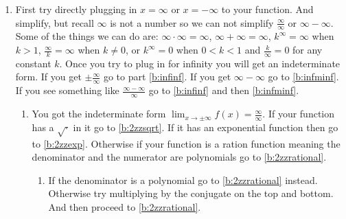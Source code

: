 \documentclass[12pt]{article}
\begin{document}
\begin{enumerate}
    \item \label{b:infstep1} First try directly plugging in $x=\infty$ or $x=-\infty$ to your function. 
    And simplify, but recall $\infty$ is not a number so we can not simplify 
    $\frac{\infty}{\infty}$ or $\infty-\infty$. Some of the things we can do are: 
    $\infty\cdot\infty=\infty$, $\infty+\infty=\infty$, $k^\infty=\infty$ when $k>1$, 
    $\frac{\infty}{k}=\infty$ when $k\neq 0$, or $k^\infty=0$ when $0<k<1$ and $\frac{k}{\infty}=0$ 
    for any constant $k$. 
    Once you try to plug in for infinity you will get an indeterminate form.
    If you get $\pm\frac{\infty}{\infty}$ go to part \ref{b:infinf}. If you get $\infty-\infty$ go to \ref{b:infminf}.
    If you see something like $\frac{\infty-\infty}{\infty}$ go to \ref{b:infinf} and then \ref{b:infminf}.
    \begin{enumerate}[label=(\alph*)]
        \item \label{b:infinf} You got the indeterminate form 
        $\displaystyle{\lim_{x\to \pm\infty}f(x)}=\frac{\infty}{\infty}$.
        If your function has a $\sqrt{\cdot}$ in it go to \ref{b:2zzsqrt}. If it has an exponential function 
        then go to \ref{b:2zzexp}. Otherwise if your function is a ration function meaning the denominator and the numerator are polynomials go to \ref{b:2zzrational}.\\
        \begin{enumerate}[label=(\roman*)]
            \item \label{b:2zzsqrt} If the denominator is a polynomial go to \ref{b:2zzrational} instead. 
            Otherwise try multiplying by the conjugate on the top and bottom. 
            And then proceed to \ref{b:2zzrational}.\\

            

\end{enumerate}
\end{enumerate}
\end{enumerate}
\end{document}

